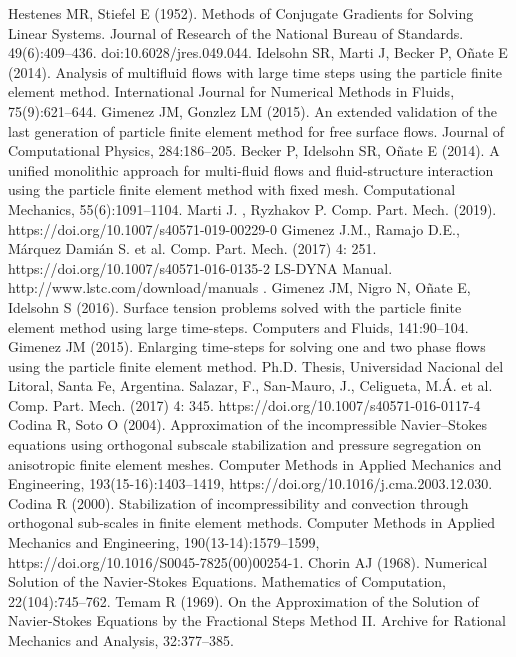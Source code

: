  Hestenes MR, Stiefel E (1952). Methods of Conjugate Gradients for Solving Linear Systems. Journal of Research of the National Bureau of Standards. 49(6):409--436. doi:10.6028/jres.049.044.
 Idelsohn SR, Marti J, Becker P, O\~nate E (2014). Analysis of multifluid flows with large time steps using the particle finite element method. International Journal for Numerical Methods in Fluids, 75(9):621--644.
 Gimenez JM, Gonzlez LM (2015). An extended validation of the last generation of particle finite element method for free surface flows. Journal of Computational Physics, 284:186--205.
 Becker P, Idelsohn SR, O\~nate E (2014). A unified monolithic approach for multi-fluid flows and fluid-structure interaction using the particle finite element method with fixed mesh. Computational Mechanics, 55(6):1091--1104.
 Marti J. , Ryzhakov P. Comp. Part. Mech. (2019). https://doi.org/10.1007/s40571-019-00229-0
 Gimenez J.M., Ramajo D.E., Márquez Damián S. et al. Comp. Part. Mech. (2017) 4: 251. https://doi.org/10.1007/s40571-016-0135-2
 LS-DYNA Manual.\\
http://www.lstc.com/download/manuals .
 Gimenez JM, Nigro N, O\~nate E, Idelsohn S (2016). Surface tension problems solved with the particle finite element method using large time-steps. Computers and Fluids, 141:90--104.
 Gimenez JM (2015). Enlarging time-steps for solving one and two phase flows using the particle finite element method. Ph.D. Thesis, Universidad Nacional del Litoral, Santa Fe, Argentina.
 Salazar, F., San-Mauro, J., Celigueta, M.Á. et al. Comp. Part. Mech. (2017) 4: 345. https://doi.org/10.1007/s40571-016-0117-4
 Codina R, Soto O (2004). Approximation of the incompressible Navier–Stokes equations using orthogonal subscale stabilization and pressure segregation on anisotropic finite element meshes. Computer Methods in Applied Mechanics and Engineering, 193(15-16):1403--1419, https://doi.org/10.1016/j.cma.2003.12.030.
 Codina R (2000). Stabilization of incompressibility and convection through orthogonal sub-scales in finite element methods. Computer Methods in Applied Mechanics and Engineering, 190(13-14):1579--1599, https://doi.org/10.1016/S0045-7825(00)00254-1.
 Chorin AJ (1968). Numerical Solution of the Navier-Stokes Equations. Mathematics of Computation, 22(104):745--762.
 Temam R (1969). On the Approximation of the Solution of Navier-Stokes Equations by the Fractional Steps Method II. Archive for Rational Mechanics and Analysis, 32:377--385.
